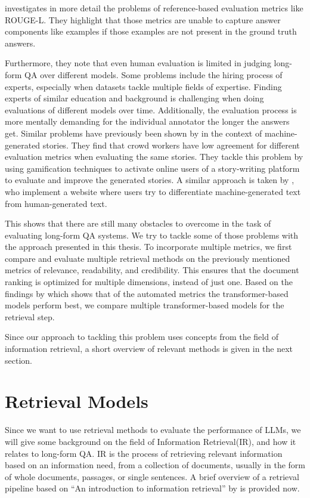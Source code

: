 \cite{krishna:2021:Hurdles} investigates in more detail the problems of reference-based evaluation metrics like ROUGE-L. 
They highlight that those metrics are unable to capture answer components like examples if those examples are not present in the ground truth answers. 

Furthermore, they note that even human evaluation is limited in judging long-form QA over different models.
Some problems include the hiring process of experts, especially when datasets tackle multiple fields of expertise.
Finding experts of similar education and background is challenging when doing evaluations of different models over time.
Additionally, the evaluation process is more mentally demanding for the individual annotator the longer the answers get.
Similar problems have previously been shown by \cite{akoury:2020:Storium} in the context of machine-generated stories.
They find that crowd workers have low agreement for different evaluation metrics when evaluating the same stories.
They tackle this problem by using gamification techniques to activate online users of a story-writing platform to evaluate and improve the generated stories.
A similar approach is taken by \cite{dugan:2020:RoFT}, who implement a website where users try to differentiate machine-generated text from human-generated text.

This shows that there are still many obstacles to overcome in the task of evaluating long-form QA systems.
We try to tackle some of those problems with the approach presented in this thesis.
To incorporate multiple metrics, we first compare and evaluate multiple retrieval methods on the previously mentioned metrics of relevance, readability, and credibility.
This ensures that the document ranking is optimized for multiple dimensions, instead of just one.
Based on the findings by \cite{xu:2023:A} which shows that of the automated metrics the transformer-based models perform best, we compare multiple transformer-based models for the retrieval step.

Since our approach to tackling this problem uses concepts from the field of information retrieval, a short overview of relevant methods is given in the next section.

\section{Retrieval Models}\label{sec:retrieval-models}
Since we want to use retrieval methods to evaluate the performance of LLMs, we will give some background on the field of Information Retrieval(IR), and how it relates to long-form QA.
IR is the process of retrieving relevant information based on an information need, from a collection of documents, usually in the form of whole documents, passages, or single sentences.
A brief overview of a retrieval pipeline based on ``An introduction to information retrieval'' by \cite{manning:2009:An} is provided now.


